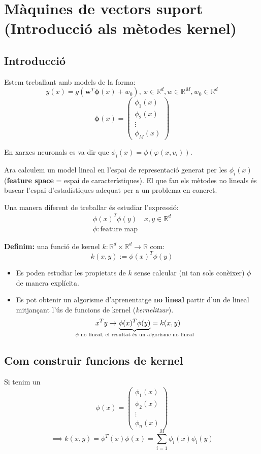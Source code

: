 \chapter{Màquines de vectors suport (Introducció als mètodes kernel)}
\section{Introducció}

Estem treballant amb models de la forma:
$$
y(x) = g(\boldsymbol{w}^T\boldsymbol{\phi}(x) + w_0),\ x \in \mathbb{R}^d, w \in \mathbb{R}^M, w_0 \in \mathbb{R}^d
$$
$$
\boldsymbol{\phi}(x) =
\begin{pmatrix}
\phi_1(x) \\
\phi_2(x) \\
\vdots \\
\phi_M(x)
\end{pmatrix}
$$

En xarxes neuronals es va dir que $\phi_i(x) = \phi(\varphi(x, v_i))$. 

Ara calculem un model lineal en l'espai de representació generat per les $\phi_i(x)$ (\textbf{feature space} = espai de característiques). El que fan els mètodes no lineals és buscar l'espai d'estadístiques adequat per a un problema en concret.

Una manera diferent de treballar és estudiar l'expressió:
\begin{align*}
	\phi(x)^T\phi(y) \quad x,y \in \mathbb{R}^d \\
	\phi: \text{feature map} 
\end{align*}

\textbf{Definim:} una funció de kernel $k: \mathbb{R}^d \times \mathbb{R}^d \rightarrow \mathbb{R}$ com:
$$
k(x,y) := \phi(x)^T\phi(y)
$$

\begin{itemize}
	\item Es poden estudiar les propietats de $k$ sense calcular (ni tan sols conèixer) $\phi$ de manera explícita.
	\item Es pot obtenir un algorisme d'aprenentatge \textbf{no lineal} partir d'un de lineal mitjançant l'ús de funcions de kernel (\emph{kernelitzar}).
	$$
	x^Ty \rightarrow \underbrace{\phi(x)^T\phi(y)}_{\mathclap{\text{$\phi$ no lineal, el resultat és un algorisme no lineal}}} = k(x,y)
	$$
\end{itemize}

\section{Com construir funcions de kernel}
Si tenim un 
$$
\phi(x) = 
\begin{pmatrix}
\phi_1(x)\\
\phi_2(x) \\
\vdots \\
\phi_n(x)
\end{pmatrix}
$$
$$
\implies k(x,y) = \phi^T(x)\phi(x) = \sum_{i=1}^M \phi_i(x)\phi_i(y)
$$

